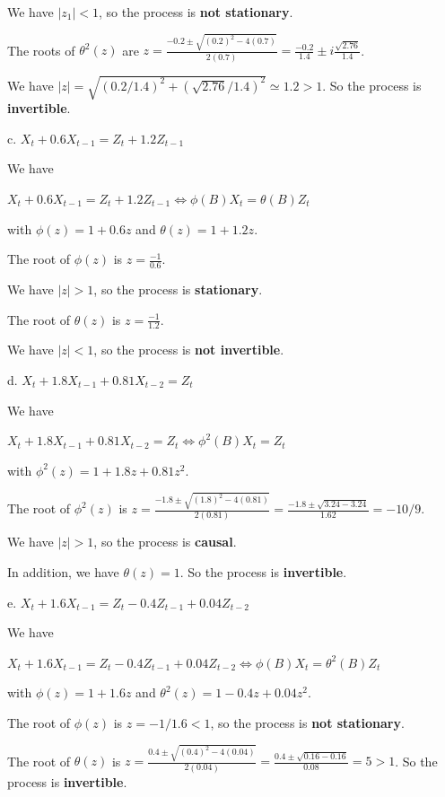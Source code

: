 \documentclass[]{article}
\begin{document}
We have $|z_1| < 1$, so the process is \textbf{not stationary}.

The roots of $\theta^2(z)$ are $z = \frac{-0.2 \pm \sqrt{(0.2)^2 - 4(0.7)}}{2(0.7)} = \frac{-0.2}{1.4} \pm i\frac{\sqrt{2.76}}{1.4}$.

We have $|z| = \sqrt{(0.2/1.4)^2 + (\sqrt{2.76}/1.4)^2} \simeq 1.2 > 1$. So the process is \textbf{invertible}.
\color{black}

c. $X_t + 0.6 X_{t-1} = Z_t + 1.2 Z_{t-1}$

\color{blue}
We have

$X_t + 0.6 X_{t-1} = Z_t + 1.2 Z_{t-1} \Leftrightarrow \phi(B)X_t = \theta(B)Z_t$

with $\phi(z) = 1 + 0.6 z$ and $\theta(z) = 1 + 1.2 z$.

The root of $\phi(z)$ is $z = \frac{-1}{0.6}$.

We have $|z| > 1$, so the process is \textbf{stationary}.

The root of $\theta(z)$ is $z = \frac{-1}{1.2}$.

We have $|z| < 1$, so the process is \textbf{not invertible}.
\color{black}

d. $X_t + 1.8 X_{t-1} + 0.81 X_{t-2} = Z_t$

\color{blue}
We have

$X_t + 1.8 X_{t-1} + 0.81 X_{t-2} = Z_t \Leftrightarrow \phi^2(B)X_t = Z_t$

with $\phi^2(z) = 1 + 1.8 z + 0.81 z^2$.

The root of $\phi^2(z)$ is $z = \frac{-1.8 \pm \sqrt{(1.8)^2 - 4(0.81)}}{2(0.81)} = \frac{-1.8 \pm \sqrt{3.24-3.24}}{1.62} = -10/9$.

We have $|z| > 1$, so the process is \textbf{causal}.

In addition, we have $\theta (z) = 1$. So the process is \textbf{invertible}.
\color{black}

e. $X_t + 1.6 X_{t-1} = Z_t - 0.4 Z_{t-1} + 0.04 Z_{t-2}$

\color{blue}
We have

$X_t + 1.6 X_{t-1} = Z_t - 0.4 Z_{t-1} + 0.04 Z_{t-2} \Leftrightarrow \phi(B)X_t = \theta^2(B)Z_t$

with $\phi(z) = 1 + 1.6 z$ and $\theta^2(z) = 1 - 0.4 z + 0.04 z^2$.

The root of $\phi(z)$ is $z = -1/1.6 < 1$, so the process is \textbf{not stationary}.

The root of $\theta(z)$ is $z = \frac{0.4 \pm \sqrt{(0.4)^2 - 4(0.04)}}{2(0.04)} = \frac{0.4 \pm \sqrt{0.16-0.16}}{0.08} = 5 > 1$. So the process is \textbf{invertible}.
\end{document}
